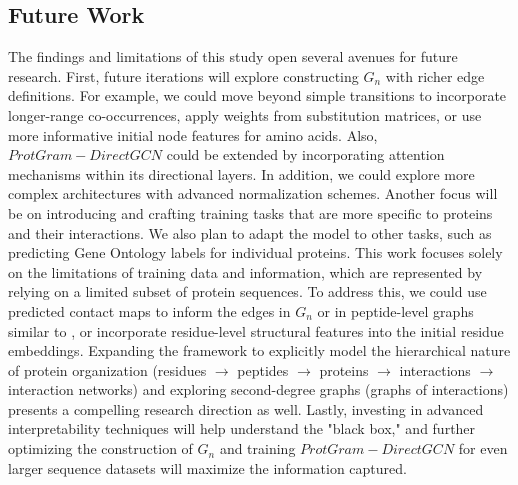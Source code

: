 \documentclass[utf8]{article}
\begin{document}
	\subsection{Future Work}
	The findings and limitations of this study open several avenues for future research. First, future iterations will explore constructing $G_{n}$ with richer edge definitions. For example, we could move beyond simple transitions to incorporate longer-range co-occurrences, apply weights from substitution matrices, or use more informative initial node features for amino acids. Also, $ProtGram-DirectGCN$ could be extended by incorporating attention mechanisms within its directional layers. In addition, we could explore more complex architectures with advanced normalization schemes. Another focus will be on introducing and crafting training tasks that are more specific to proteins and their interactions. We also plan to adapt the model to other tasks, such as predicting Gene Ontology labels for individual proteins. This work focuses solely on the limitations of training data and information, which are represented by relying on a limited subset of protein sequences. To address this, we could use predicted contact maps to inform the edges in $G_{n}$ or in peptide-level graphs similar to \cite{sledzieski_dscripttranslatesgenome_2021}, or incorporate residue-level structural features into the initial residue embeddings. Expanding the framework to explicitly model the hierarchical nature of protein organization (residues $\rightarrow$ peptides $\rightarrow$ proteins $\rightarrow$ interactions $\rightarrow$ interaction networks) and exploring second-degree graphs (graphs of interactions) presents a compelling research direction \cite{jeh_simrankmeasurestructuralcontext_2002} as well. Lastly, investing in advanced interpretability techniques will help understand the "black box," and further optimizing the construction of $G_{n}$ and training $ProtGram-DirectGCN$ for even larger sequence datasets will maximize the information captured.
	
\end{document}

